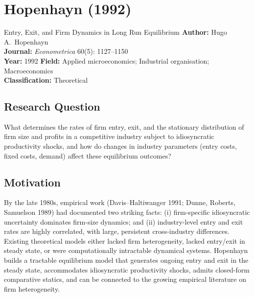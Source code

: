 \chapter{Hopenhayn (1992)}

\begin{paperbox}{Entry, Exit, and Firm Dynamics in Long Run Equilibrium}
\textbf{Author:} Hugo A.\ Hopenhayn\\[3pt]
\textbf{Journal:} \textit{Econometrica} 60(5): 1127--1150\\[3pt]
\textbf{Year:} 1992 \quad\textbf{Field:} Applied microeconomics; Industrial
organisation; Macroeconomics\\[3pt]
\textbf{Classification:} Theoretical
\end{paperbox}

\section{Research Question}

What determines the rates of firm entry, exit, and the stationary distribution
of firm size and profits in a competitive industry subject to idiosyncratic
productivity shocks, and how do changes in industry parameters (entry costs,
fixed costs, demand) affect these equilibrium outcomes?

\section{Motivation}

By the late 1980s, empirical work (Davis--Haltiwanger 1991; Dunne, Roberts,
Samuelson 1989) had documented two striking facts: (i) firm-specific
idiosyncratic uncertainty dominates firm-size dynamics; and (ii) industry-level
entry and exit rates are highly correlated, with large, persistent
cross-industry differences. Existing theoretical models either lacked firm
heterogeneity, lacked entry/exit in steady state, or were computationally
intractable dynamical systems. Hopenhayn builds a tractable equilibrium model
that generates ongoing entry and exit in the steady state, accommodates
idiosyncratic productivity shocks, admits closed-form comparative statics, and
can be connected to the growing empirical literature on firm heterogeneity.


